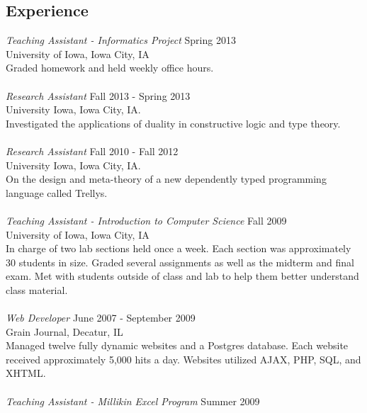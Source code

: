 \documentclass[line,margin]{res}
\begin{document}
\begin{resume}
  \section{\small Experience} 
                 {\sl Teaching Assistant - Informatics Project} \hfill Spring 2013\\
		  University of Iowa, Iowa City, IA\\
                  Graded homework and held weekly office hours.\\ 
                  \\
                 {\sl Research Assistant} \hfill Fall 2013 - Spring 2013\\
                  University Iowa, Iowa City, IA.\\
                  Investigated the applications of duality in constructive logic
                  and type theory.\\
                  \\
                 {\sl Research Assistant} \hfill Fall 2010 - Fall 2012\\
                  University Iowa, Iowa City, IA.\\
                  On the design and meta-theory of a
                  new dependently typed programming language called
                  Trellys.\\
                  \\
                  {\sl Teaching Assistant - Introduction to Computer Science} \hfill Fall 2009\\
		  University of Iowa, Iowa City, IA\\
                  In charge of two lab sections held once a week.  Each section was
                  approximately 30 students in size.  Graded several assignments as well
                  as the midterm and final exam.  Met with students outside of class and
                  lab to help them better understand class material.\\ 
                  \\
		  {\sl Web Developer} \hfill June 2007 - September 2009\\
                  Grain Journal, Decatur, IL\\
                  Managed twelve fully dynamic websites and a Postgres database.  Each
                  website received approximately 5,000 hits a day.  Websites utilized
                  AJAX, PHP, SQL, and XHTML.\\
		  \\
	          {\sl Teaching Assistant - Millikin Excel Program} \hfill Summer 2009\\

\end{resume}
\end{document}
